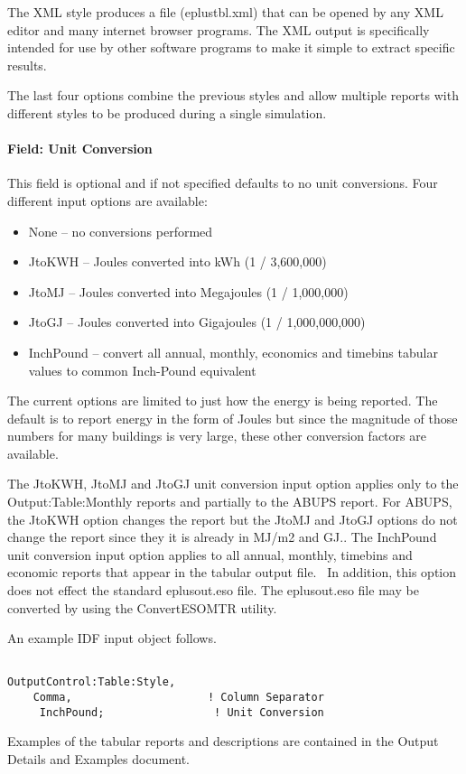 The XML style produces a file (eplustbl.xml) that can be opened by any XML editor and many internet browser programs. The XML output is specifically intended for use by other software programs to make it simple to extract specific results.

The last four options combine the previous styles and allow multiple reports with different styles to be produced during a single simulation.

\paragraph{Field: Unit Conversion}\label{field-unit-conversion}

This field is optional and if not specified defaults to no unit conversions. Four different input options are available:

\begin{itemize}
\item
  None -- no conversions performed
\item
  JtoKWH -- Joules converted into kWh (1 / 3,600,000)
\item
  JtoMJ -- Joules converted into Megajoules (1 / 1,000,000)
\item
  JtoGJ -- Joules converted into Gigajoules (1 / 1,000,000,000)
\item
  InchPound -- convert all annual, monthly, economics and timebins tabular values to common Inch-Pound equivalent
\end{itemize}

The current options are limited to just how the energy is being reported. The default is to report energy in the form of Joules but since the magnitude of those numbers for many buildings is very large, these other conversion factors are available.

The JtoKWH, JtoMJ and JtoGJ unit conversion input option applies only to the Output:Table:Monthly reports and partially to the ABUPS report. For ABUPS, the JtoKWH option changes the report but the JtoMJ and JtoGJ options do not change the report since they it is already in MJ/m2 and GJ.. The InchPound unit conversion input option applies to all annual, monthly, timebins and economic reports that appear in the tabular output file.~ In addition, this option does not effect the standard eplusout.eso file. The eplusout.eso file may be converted by using the ConvertESOMTR utility.

An example IDF input object follows.

\begin{lstlisting}

OutputControl:Table:Style,
    Comma,                     ! Column Separator
     InchPound;                 ! Unit Conversion
\end{lstlisting}

Examples of the tabular reports and descriptions are contained in the Output Details and Examples document.
